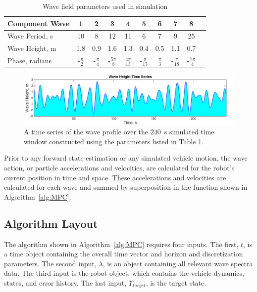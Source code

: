 \documentclass[letterpaper, 10 pt, conferences]{IEEEconf}  %
\begin{document}
\setlength\tabcolsep{5pt}
\begin{table}
\caption{Wave field parameters used in simulation}
\begin{center}
\def\arraystretch{1.1}%
\begin{tabular}{ |l|c|c|c|c|c|c|c|c|c| } 
 \hline 
 Component Wave & 1 & 2 & 3 & 4 & 5 & 6 & 7 & 8 \\ 
 \hline
 Wave Period, s & 10 & 8 & 12 & 11 & 6 & 7 & 9 & 25  \\ 
 Wave Height, m & 1.8 & 0.9 & 1.6 & 1.3 & 0.4 & 0.5 & 1.1 & 0.7 \\ 
 Phase, radians & -$\frac{\pi}{2}$ & -$\frac{\pi}{4}$ & -$\frac{5\pi}{8}$ & $\frac{4\pi}{13}$ & -$\frac{\pi}{15}$ & $\frac{\pi}{3}$ & -$\frac{\pi}{18}$ & -$\frac{7\pi}{4}$\\
 \hline
\end{tabular}
\end{center}
\label{table:waveData}
\end{table}

\begin{figure}
\includegraphics[width=1\columnwidth]{images/eta}
\vspace*{-14pt}
\centering
\caption{A time series of the wave profile over the 240~s simulated time window constructed using the parameters listed in Table \ref{table:waveData}.}
\label{fig:eta}
\end{figure}

Prior to any forward state estimation or any simulated vehicle motion, the wave action, or particle accelerations and velocities, are calculated for the robot's current position in time and space. These accelerations and velocities are calculated for each wave and summed by superposition in the function  shown in Algorithm~\ref{alg:MPC}.

\subsection{Algorithm Layout}

The  algorithm shown in Algorithm~\ref{alg:MPC} requires four inputs. The first, $t$, is a time object containing the overall time vector and horizon and discretization parameters. The second input, $\lambda$, is an object containing all relevant wave spectra data. The third input is the robot object, which contains the vehicle dynamics, states, and error history. The last input, $\Upsilon_{target}$, is the target state.
\end{document}
